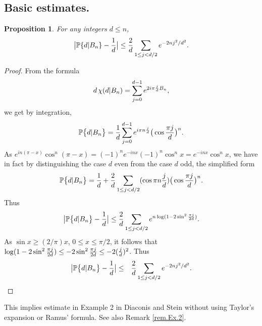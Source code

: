 \documentclass[11pt,draft,reqno]{amsart}
\newtheorem{proposition}[theorem]{Proposition}
\theoremstyle{definition}
\theoremstyle{remarks}
\numberwithin{equation}{section}
\def\P{{\mathcal P}}
\def\E{{\mathbb E \,}}
\def\P{{\mathbb P}}
\begin{document}
 
\subsection{Basic estimates.}
\begin{proposition}   \label{Lemma44}
  For any integers   
 $d\le n$,
  \begin{equation}\label{multiple1}\big|\P \{ d | B_n \} -\frac{1}{d}\big|
   \le      {2\over d}\sum_{ 1\le j<d/2}
e^{-        {
 2n j^2/  d^2}  } . 
\end{equation}
\end{proposition}
\begin{proof} From the formula 
\begin{equation}\label{basic}d\,\chi(d| B_n)=\sum_{j=0}^{d-1} e^{2i\pi  {j \over d}B_{n }},
\end{equation}
  we get by integration,
\begin{equation}\label{basic.i} \P\big\{ d | B_n\big\}={1\over d}\sum_{j=0}^{d-1} e^{i\pi n{j\over d}}\big(\cos { \pi j\over d}\big)^{n}.
  \end{equation}
 As $e^{i  n(\pi-x)} \cos^n    (\pi-x)  =(-1)^ne^{-i 
nx}  (-1)^n\cos^n   x= e^{-i 
nx}  \cos^n   x  $, we have in fact  by distinguishing the case $d$ even from the case $d$ odd,   the simplified form
\begin{equation}\label{Lemma41} \P\big\{ d | B_n\big\} ={1\over d}+ {2\over d}\sum_{ 1\le j<d/2}
(\cos{ \pi n{j\over d}})\big(\cos { \pi j\over d}\big)^{n}.
\end{equation}
    Thus   
    $$\big|\P\big\{ d | B_n\big\} -\frac{1}{d}\big|
   \le      {2\over d}\sum_{ 1\le j<d/2}
e^{n\log (  1-2 \sin^2{ \pi j\over 2d})} .$$
     As $\sin x\ge (2/\pi )x$, $0\le x\le \pi/2 $, it follows that $\log (  1-2 \sin^2{ \pi j\over 2d})\le -2 \sin^2{ \pi j\over 2d}\le  -2  ({
  j\over  d}) ^2   $. Thus 
\begin{eqnarray*} \big|\P\big\{ d | B_n\big\} -\frac{1}{d}\big|
  &\le &    {2\over d}\sum_{ 1\le j<d/2}
e^{-        {
 2n j^2/  d^2}  }.
\end{eqnarray*}   
\end{proof} 
This   implies estimate in   Example 2 in Diaconis and Stein \cite{DS}    without using Taylor's expansion or Ramus' formula.  See also Remark \ref{rem.Ex.2}.
\end{document}
